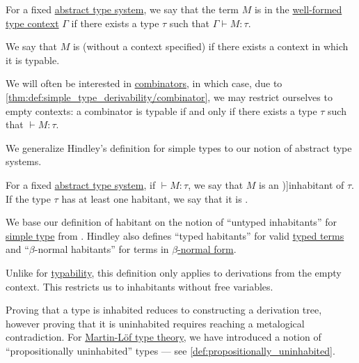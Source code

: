 \begin{definition}\label{def:typability}
  For a fixed \hyperref[def:abstract_type_system]{abstract type system}, we say that the term \( M \) is  in the \hyperref[rem:well_formed_context]{well-formed} \hyperref[def:type_context]{type context} \( \Gamma \) if there exists a type \( \tau \) such that \( \Gamma \vdash M: \tau \).

  We say that \( M \) is  (without a context specified) if there exists a context in which it is typable.
\end{definition}
\begin{comments}
  \item We will often be interested in \hyperref[def:lambda_combinator]{combinators}, in which case, due to \cref{thm:def:simple_type_derivability/combinator}, we may restrict ourselves to empty contexts: a combinator is typable if and only if there exists a type \( \tau \) such that \( \vdash M: \tau \).

  \item We generalize Hindley's definition for simple types to our notion of abstract type systems.
\end{comments}

\begin{definition}\label{def:type_habitation}
  For a fixed \hyperref[def:abstract_type_system]{abstract type system}, if \( \vdash M: \tau \), we say that \( M \) is an \term[en=untyped inhabitant (\cite[8A1]{Hindley1997BasicSTT})]{inhabitant} of \( \tau \). If the type \( \tau \) has at least one habitant, we say that it is .
\end{definition}
\begin{comments}
  \item We base our definition of habitant on the notion of \enquote{untyped inhabitants} for \hyperref[def:simple_type]{simple type} from \cite[def. 8A1]{Hindley1997BasicSTT}. Hindley also defines \enquote{typed habitants} for valid \hyperref[def:typed_lambda_term]{typed terms} and \enquote{\( \beta \)-normal habitants} for terms in \hyperref[def:lambda_term_normal_form]{\( \beta \)-normal form}.

  \item Unlike for \hyperref[def:typability]{typability}, this definition only applies to derivations from the empty context. This restricts us to inhabitants without free variables.

  \item Proving that a type is inhabited reduces to constructing a derivation tree, however proving that it is uninhabited requires reaching a metalogical contradiction. For \hyperref[def:mltt]{Martin-L\"of type theory}, we have introduced a notion of \enquote{propositionally uninhabited} types --- see \cref{def:propositionally_uninhabited}.
\end{comments}

